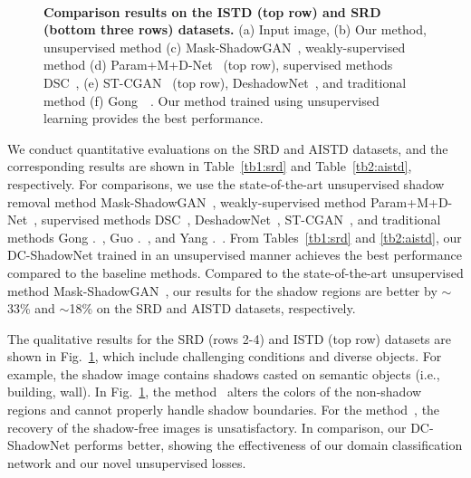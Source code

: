 \documentclass[10pt,twocolumn,letterpaper]{article}
\begin{document}
\begin{figure}[t]
	\hfill\\
	\vspace{-0.01in}
	\caption{\textbf{Comparison results on the ISTD (top row) and SRD (bottom three rows) datasets.} (a) Input image, (b) Our method, unsupervised
	method (c) Mask-ShadowGAN~\cite{Hu19}, weakly-supervised method (d) Param+M+D-Net~\cite{le2020shadow} (top row), supervised methods DSC~\cite{Hu18}, (e) ST-CGAN~\cite{Wang18} (top row), DeshadowNet~\cite{Qu17}, and traditional method (f) Gong~\etal~\cite{Gong14}. Our method trained using unsupervised learning provides the best performance.}
	\vspace{-0.1in}
	\label{fig:SRD}
\end{figure}

\vspace{0.2cm}
We conduct quantitative evaluations on the SRD and AISTD datasets, and the corresponding results are shown in Table~\ref{tb1:srd} and Table~\ref{tb2:aistd}, respectively.
For comparisons, we use the state-of-the-art unsupervised shadow removal method Mask-ShadowGAN~\cite{Hu19}, weakly-supervised method Param+M+D-Net~\cite{le2020shadow}, supervised methods DSC~\cite{Hu18}, DeshadowNet~\cite{Qu17}, ST-CGAN~\cite{Wang18},
and traditional methods Gong \etal.~\cite{Gong14}, Guo \etal.~\cite{Guo12}, and Yang \etal.~\cite{Yang12}.
From Tables~\ref{tb1:srd} and \ref{tb2:aistd}, our DC-ShadowNet trained in an unsupervised manner achieves the best performance compared to the baseline methods. 
Compared to the state-of-the-art unsupervised method Mask-ShadowGAN~\cite{Hu19}, our results for the shadow regions are better by $\sim$33\% and $\sim$18\% on the SRD and AISTD datasets, respectively.


The qualitative results for the SRD (rows 2-4) and ISTD (top row) datasets are shown in Fig.~\ref{fig:SRD}, which include challenging conditions and diverse objects. For example, the shadow image contains shadows casted on semantic objects (i.e., building, wall).
In Fig.~\ref{fig:SRD}, the method~\cite{Hu19} alters the colors of the non-shadow regions and cannot properly handle shadow boundaries. For the method~\cite{Gong14}, the recovery of the shadow-free images is unsatisfactory. 
In comparison, our DC-ShadowNet performs better, showing the effectiveness of our domain classification network and our novel unsupervised losses.
\end{document}

